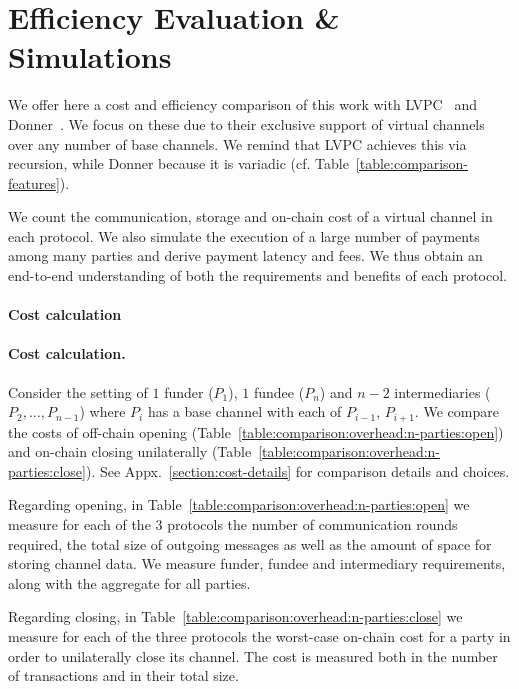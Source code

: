 \section{Efficiency Evaluation \& Simulations}
  \label{section:comparison}
  We offer here a cost and efficiency comparison of this work with
  LVPC~\cite{10.1007/978-3-030-65411-5_18} and Donner~\cite{donner}. We focus on
  these due to their exclusive support of
  virtual channels over any number of base channels. We remind that LVPC
  achieves this via recursion, while Donner
  because it is variadic (cf. Table~\ref{table:comparison-features}).

  We count the communication, storage and on-chain cost of a virtual
  channel in each protocol. We also simulate the execution of a large number
  of payments among many parties and derive payment latency and fees. We thus
  obtain an end-to-end understanding of both the requirements and benefits
  of each protocol.

  \makeatletter%
    {\paragraph{Cost calculation}}%
    {\paragraph{Cost calculation.}}%
  \makeatother%
  Consider the setting of $1$
  funder ($P_1$), $1$ fundee ($P_n$) and $n-2$ intermediaries ($P_2, \dots,
  P_{n-1}$) where $P_i$ has a base channel with each of $P_{i-1}$,
  $P_{i+1}$. We compare the costs of off-chain opening
  (Table~\ref{table:comparison:overhead:n-parties:open}) and on-chain
  closing unilaterally
  (Table~\ref{table:comparison:overhead:n-parties:close}).
  See Appx.~\ref{section:cost-details} for comparison details and choices.

  Regarding opening, in
  Table~\ref{table:comparison:overhead:n-parties:open} we measure for each of
  the $3$ protocols the number of communication rounds required, the total
  size of outgoing messages as well as the amount of space for storing
  channel data. We measure funder, fundee
  and intermediary requirements, along with the aggregate for all parties.

  Regarding closing, %
  in Table~\ref{table:comparison:overhead:n-parties:close} we
  measure for each of the three protocols the worst-case on-chain cost for a party
  in order to unilaterally close its channel. The cost is
  measured both in the number of transactions and in their total size.

